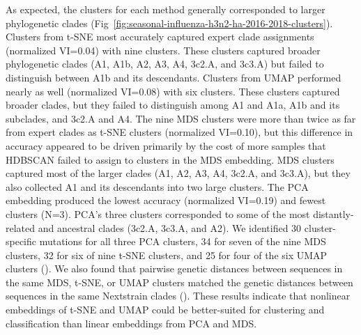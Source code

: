 \documentclass[10pt,letterpaper]{article}
\begin{document}
As expected, the clusters for each method generally corresponded to larger phylogenetic clades (Fig~\ref{fig:seasonal-influenza-h3n2-ha-2016-2018-clusters}).
Clusters from t-SNE most accurately captured expert clade assignments (normalized VI=0.04) with nine clusters.
These clusters captured broader phylogenetic clades (A1, A1b, A2, A3, A4, 3c2.A, and 3c3.A) but failed to distinguish between A1b and its descendants.
Clusters from UMAP performed nearly as well (normalized VI=0.08) with six clusters.
These clusters captured broader clades, but they failed to distinguish among A1 and A1a, A1b and its subclades, and 3c2.A and A4.
The nine MDS clusters were more than twice as far from expert clades as t-SNE clusters (normalized VI=0.10), but this difference in accuracy appeared to be driven primarily by the cost of more samples that HDBSCAN failed to assign to clusters in the MDS embedding.
MDS clusters captured most of the larger clades (A1, A2, A3, A4, 3c2.A, and 3c3.A), but they also collected A1 and its descendants into two large clusters.
The PCA embedding produced the lowest accuracy (normalized VI=0.19) and fewest clusters (N=3).
PCA's three clusters corresponded to some of the most distantly-related and ancestral clades (3c2.A, 3c3.A, and A2).
We identified 30 cluster-specific mutations for all three PCA clusters, 34 for seven of the nine MDS clusters, 32 for six of nine t-SNE clusters, and 25 for four of the six UMAP clusters ().
We also found that pairwise genetic distances between sequences in the same MDS, t-SNE, or UMAP clusters matched the genetic distances between sequences in the same Nextstrain clades ().
These results indicate that nonlinear embeddings of t-SNE and UMAP could be better-suited for clustering and classification than linear embeddings from PCA and MDS.
\end{document}
